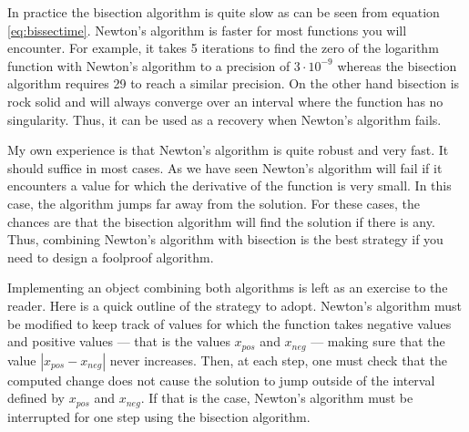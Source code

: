 In practice the bisection algorithm is quite slow as can be seen
from equation \ref{eq:bissectime}. Newton's algorithm is faster
for most functions you will encounter. For example, it takes 5
iterations to find the zero of the logarithm function with
Newton's algorithm to a precision of $3\cdot 10^{-9}$ whereas the
bisection algorithm requires 29 to reach a similar precision. On
the other hand bisection is rock solid and will always converge
over an interval where the function has no singularity. Thus, it
can be used as a recovery when Newton's algorithm fails.

My own experience is that Newton's algorithm is quite robust and
very fast. It should suffice in most cases. As we have seen
Newton's algorithm will fail if it encounters a value for which
the derivative of the function is very small. In this case, the
algorithm jumps far away from the solution. For these cases, the
chances are that the bisection algorithm will find the solution if
there is any. Thus, combining Newton's algorithm with bisection is
the best strategy if you need to design a foolproof algorithm.

Implementing an object combining both algorithms is left as an
exercise to the reader. Here is a quick outline of the strategy to
adopt. Newton's algorithm must be modified to keep track of values
for which the function takes negative values and positive values
--- that is the values $x_{pos}$ and $x_{neg}$
--- making sure that the value $\left| x_{pos}-x_{neg}\right|$
never increases. Then, at each step, one must check that the
computed change does not cause the solution to jump outside of the
interval defined by $x_{pos}$ and $x_{neg}$.
If that is the case, Newton's algorithm must be interrupted for one step using the bisection algorithm.

